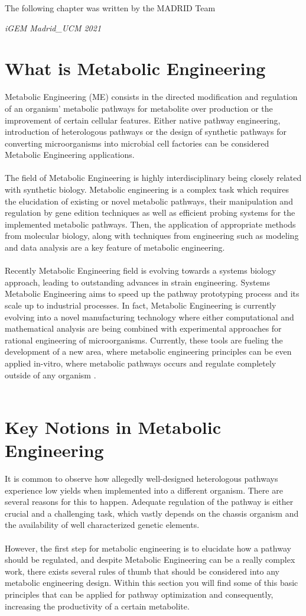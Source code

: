 \epigraph{The following chapter was written by the MADRID Team }{\textit{iGEM Madrid\_UCM 2021}}
\section{What is Metabolic Engineering}
Metabolic Engineering (ME) consists in the directed modification and regulation of an organism' metabolic pathways for metabolite over production or the improvement of certain cellular features. Either native pathway engineering, introduction of heterologous pathways or the design of synthetic pathways for converting microorganisms into microbial cell factories can be considered Metabolic Engineering applications. \\ \\
The field of Metabolic Engineering is highly interdisciplinary being closely related with synthetic biology. Metabolic engineering is a complex task which requires the elucidation of existing or novel metabolic pathways, their manipulation and regulation by gene edition techniques as well as efficient probing systems for the implemented metabolic pathways. Then, the application of appropriate methods from molecular biology, along with techniques from engineering  such as modeling and data analysis are a key feature of metabolic engineering. \\ \\
Recently Metabolic Engineering field is evolving towards a systems  biology approach, leading to outstanding advances in strain engineering. Systems Metabolic Engineering aims to speed up the pathway prototyping process and its scale up to industrial processes. In fact, Metabolic Engineering is currently evolving into a novel manufacturing technology where either computational and mathematical analysis are being combined with experimental approaches for rational engineering of microorganisms. Currently, these tools are fueling the development of a new area, where metabolic engineering principles can be even applied in-vitro, where metabolic pathways occurs and regulate completely outside of any organism \parencite{Wei2020}.
\\ \\
\section{Key Notions in Metabolic Engineering}
It is common to observe how allegedly well-designed heterologous pathways experience low yields when implemented into a different organism. There are several reasons for this to happen. Adequate regulation of the pathway is either crucial and a challenging task, which vastly depends on the chassis organism and the availability of well characterized genetic elements. \\ \\
However, the first step for metabolic engineering is to elucidate how a pathway should be regulated, and despite Metabolic Engineering can be a really complex work, there exists several rules of thumb that should be considered into any metabolic engineering design. Within this section you will find some of this basic principles that can be applied for pathway optimization and consequently, increasing the productivity of a certain metabolite.
